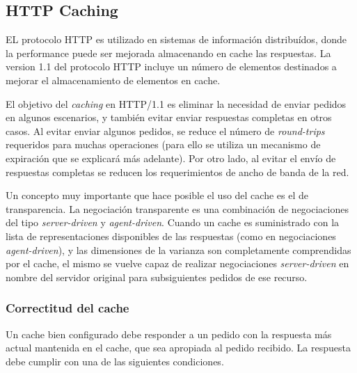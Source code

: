 
\subsection{HTTP Caching}

EL protocolo HTTP es utilizado en sistemas de información distribuídos, donde la performance puede ser mejorada almacenando en cache las respuestas. La version 1.1 del
protocolo HTTP incluye un número de elementos destinados a mejorar el almacenamiento de elementos en cache.

El objetivo del \emph{caching} en HTTP/1.1 es eliminar la necesidad de enviar pedidos en algunos escenarios, y también evitar enviar respuestas completas en otros casos. Al evitar enviar algunos pedidos, se reduce el número de \emph{round-trips} requeridos para muchas operaciones (para ello se utiliza un mecanismo de expiración que se explicará más adelante). Por otro lado, al evitar el envío de respuestas completas se reducen los requerimientos de ancho de banda de la red.

Un concepto muy importante que hace posible el uso del cache es el de transparencia. La negociación transparente es una combinación de negociaciones del tipo \emph{server-driven}
y \emph{agent-driven}. Cuando un cache es suministrado con la lista de representaciones disponibles de las respuestas (como en negociaciones \emph{agent-driven}), y las
dimensiones de la varianza son completamente comprendidas por el cache, el mismo se vuelve capaz de realizar negociaciones \emph{server-driven} en nombre del servidor original
para subsiguientes pedidos de ese recurso.

\subsubsection{Correctitud del cache}
Un cache bien configurado debe responder a un pedido con la respuesta más actual mantenida en el cache, que sea apropiada al pedido recibido. La respuesta debe cumplir
con una de las siguientes condiciones.

